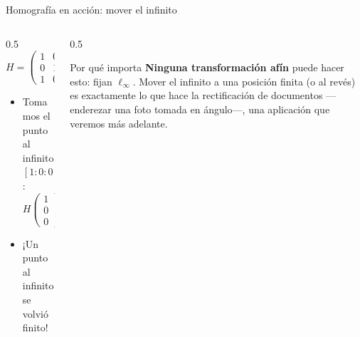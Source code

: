 \documentclass[aspectratio=169]{beamer}
\begin{document}
\begin{frame}{Homografía en acción: mover el infinito}
  \begin{columns}[T]
    \begin{column}{0.5\textwidth}
      \[
        H=\begin{pmatrix} 1&0&0\\ 0&1&0\\ 1&0&1 \end{pmatrix}
      \]
      \begin{itemize}
        \item Tomamos el punto al infinito $[1:0:0]$:
              \[
                H\begin{pmatrix}1\\0\\0\end{pmatrix}
                =\begin{pmatrix}1\\0\\1\end{pmatrix}
                = [1:0:1] \to (1,0).
              \]
        \item ¡Un punto al infinito se volvió \alert{finito}!
      \end{itemize}
    \end{column}
    \begin{column}{0.5\textwidth}
      \begin{block}{Por qué importa}
        \textbf{Ninguna transformación afín} puede hacer esto: fijan
        $\ell_\infty$. Mover el infinito a una posición finita (o al revés)
        es exactamente lo que hace la \alert{rectificación de documentos}
        —enderezar una foto tomada en ángulo—, una aplicación que veremos
        más adelante.
      \end{block}
    \end{column}
  \end{columns}
\end{frame}
\end{document}
